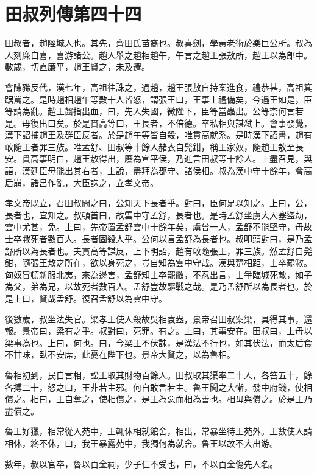 \chapter{田叔列傳第四十四}

田叔者，趙陘城人也。其先，齊田氏苗裔也。叔喜劍，學黃老術於樂巨公所。叔為人刻廉自喜，喜游諸公。趙人舉之趙相趙午，午言之趙王張敖所，趙王以為郎中。數歲，切直廉平，趙王賢之，未及遷。

會陳豨反代，漢七年，高祖往誅之，過趙，趙王張敖自持案進食，禮恭甚，高祖箕踞罵之。是時趙相趙午等數十人皆怒，謂張王曰，王事上禮備矣，今遇王如是，臣等請為亂。趙王齧指出血，曰，先人失國，微陛下，臣等當蟲出。公等柰何言若是。毋復出口矣。於是貫高等曰，王長者，不倍德。卒私相與謀弒上。會事發覺，漢下詔捕趙王及群臣反者。於是趙午等皆自殺，唯貫高就系。是時漢下詔書，趙有敢隨王者罪三族。唯孟舒、田叔等十餘人赭衣自髡鉗，稱王家奴，隨趙王敖至長安。貫高事明白，趙王敖得出，廢為宣平侯，乃進言田叔等十餘人。上盡召見，與語，漢廷臣毋能出其右者，上說，盡拜為郡守、諸侯相。叔為漢中守十餘年，會高后崩，諸呂作亂，大臣誅之，立孝文帝。

孝文帝既立，召田叔問之曰，公知天下長者乎。對曰，臣何足以知之。上曰，公，長者也，宜知之。叔頓首曰，故雲中守孟舒，長者也。是時孟舒坐虜大入塞盜劫，雲中尤甚，免。上曰，先帝置孟舒雲中十餘年矣，虜曾一人，孟舒不能堅守，毋故士卒戰死者數百人。長者固殺人乎。公何以言孟舒為長者也。叔叩頭對曰，是乃孟舒所以為長者也。夫貫高等謀反，上下明詔，趙有敢隨張王，罪三族。然孟舒自髡鉗，隨張王敖之所在，欲以身死之，豈自知為雲中守哉。漢與楚相距，士卒罷敝。匈奴冒頓新服北夷，來為邊害，孟舒知士卒罷敝，不忍出言，士爭臨城死敵，如子為父，弟為兄，以故死者數百人。孟舒豈故驅戰之哉。是乃孟舒所以為長者也。於是上曰，賢哉孟舒。復召孟舒以為雲中守。

後數歲，叔坐法失官。梁孝王使人殺故吳相袁盎，景帝召田叔案梁，具得其事，還報。景帝曰，梁有之乎。叔對曰，死罪。有之。上曰，其事安在。田叔曰，上毋以梁事為也。上曰，何也。曰，今梁王不伏誅，是漢法不行也，如其伏法，而太后食不甘味，臥不安席，此憂在陛下也。景帝大賢之，以為魯相。

魯相初到，民自言相，訟王取其財物百餘人。田叔取其渠率二十人，各笞五十，餘各搏二十，怒之曰，王非若主邪。何自敢言若主。魯王聞之大慚，發中府錢，使相償之。相曰，王自奪之，使相償之，是王為惡而相為善也。相毋與償之。於是王乃盡償之。

魯王好獵，相常從入苑中，王輒休相就館舍，相出，常暴坐待王苑外。王數使人請相休，終不休，曰，我王暴露苑中，我獨何為就舍。魯王以故不大出游。

數年，叔以官卒，魯以百金祠，少子仁不受也，曰，不以百金傷先人名。


